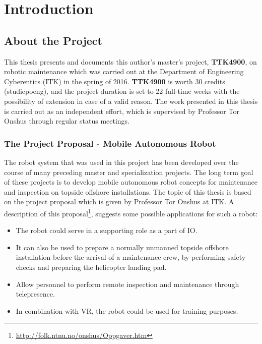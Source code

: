 \chapter{Introduction}
\label{chp:introduction} 

\section{About the Project}

This thesis presents and documents this author's master's project, \textbf{TTK4900}, on robotic maintenance which was carried out at the Department of Engineering Cyberentics (ITK) in the spring of 2016. \textbf{TTK4900} is worth 30 credits (studiepoeng), and the project duration is set to 22 full-time weeks with the possibility of extension in case of a valid reason. The work presented in this thesis is carried out as an independent effort, which is supervised by Professor Tor Onshus through regular status meetings.


\subsection{The Project Proposal - Mobile Autonomous Robot}

The robot system that was used in this project has been developed over the course of many preceding master and specialization projects. The long term goal of these projects is to develop mobile autonomous robot concepts for maintenance and inspection on topside offshore installations. The topic of this thesis is based on the project proposal which is given by Professor Tor Onshus at \ac{ITK}. A description of this proposal\footnote{\url{http://folk.ntnu.no/onshus/Oppgaver.htm}}, suggests some possible applications for such a robot: 

\begin{itemize}
	\item The robot could serve in a supporting role as a part of \ac{IO}.
	\item It can also be used to prepare a normally unmanned topside offshore installation before the arrival of a maintenance crew, by performing safety checks and preparing the helicopter landing pad.  
	\item Allow personnel to perform remote inspection and maintenance through telepresence.
	\item  In combination with \ac{VR}, the robot could be used for training purposes. 
\end{itemize}

